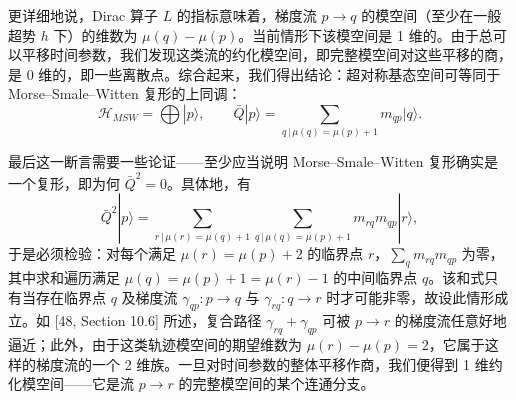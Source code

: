 更详细地说，Dirac 算子 $L$ 的指标意味着，梯度流 $p\to q$ 的模空间（至少在一般超势 $h$ 下）的维数为 $\mu(q)-\mu(p)$。当前情形下该模空间是 1 维的。由于总可以平移时间参数，我们发现这类流的约化模空间，即完整模空间对这些平移的商，是 0 维的，即一些离散点。综合起来，我们得出结论：超对称基态空间可等同于 Morse–Smale–Witten 复形的上同调：
\begin{equation}\tag{B.26}
  \mathcal{H}_{MSW}=\bigoplus|p\rangle,\qquad \bar Q|p\rangle=\sum_{q\,|\,\mu(q)=\mu(p)+1}m_{qp}|q\rangle.
\end{equation}

最后这一断言需要一些论证——至少应当说明 Morse–Smale–Witten 复形确实是一个复形，即为何 $\bar Q^2=0$。具体地，有
\begin{equation}\tag{B.27}
  \bar Q^2|p\rangle=\sum_{r\,|\,\mu(r)=\mu(q)+1}\sum_{q\,|\,\mu(q)=\mu(p)+1}m_{rq}m_{qp}|r\rangle,
\end{equation}
于是必须检验：对每个满足 $\mu(r)=\mu(p)+2$ 的临界点 $r$，$\sum_q m_{rq}m_{qp}$ 为零，其中求和遍历满足 $\mu(q)=\mu(p)+1=\mu(r)-1$ 的中间临界点 $q$。该和式只有当存在临界点 $q$ 及梯度流 $\gamma_{qp}:p\to q$ 与 $\gamma_{rq}:q\to r$ 时才可能非零，故设此情形成立。如 [48, Section 10.6] 所述，复合路径 $\gamma_{rq}+\gamma_{qp}$ 可被 $p\to r$ 的梯度流任意好地逼近；此外，由于这类轨迹模空间的期望维数为 $\mu(r)-\mu(p)=2$，它属于这样的梯度流的一个 2 维族。一旦对时间参数的整体平移作商，我们便得到 1 维约化模空间——它是流 $p\to r$ 的完整模空间的某个连通分支。

